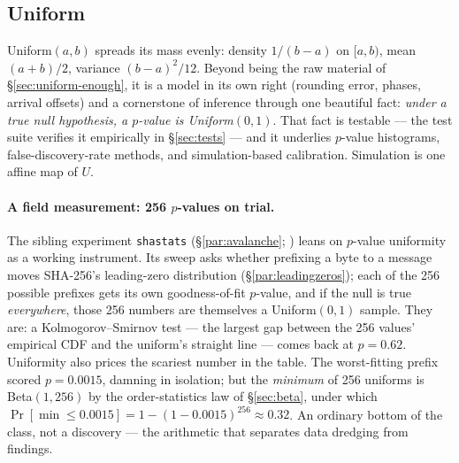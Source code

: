 \documentclass[11pt]{article}
\numberwithin{equation}{section}
\begin{document}
\subsection{Uniform}\label{sec:uniform}

Uniform$(a,b)$ spreads its mass evenly: density $1/(b-a)$ on $[a,b)$, mean
$(a+b)/2$, variance $(b-a)^2/12$.  Beyond being the raw material of
\S\ref{sec:uniform-enough}, it is a model in its own right (rounding
error, phases, arrival offsets) and a cornerstone of inference through one
beautiful fact: \emph{under a true null hypothesis, a $p$-value is
Uniform$(0,1)$}.  That fact is testable --- the test suite verifies it
empirically in \S\ref{sec:tests} --- and it underlies $p$-value histograms,
false-discovery-rate methods, and simulation-based calibration.
Simulation is one affine map of $U$.

\paragraph{A field measurement: 256 $p$-values on trial.}
\label{par:pvalunif}
The sibling experiment \texttt{shastats} (\S\ref{par:avalanche};
\citealp{shastats2026}) leans on $p$-value uniformity as a working
instrument.  Its sweep asks whether prefixing a byte to a message moves
SHA-256's leading-zero distribution (\S\ref{par:leadingzeros}); each of
the 256 possible prefixes gets its own goodness-of-fit $p$-value, and if
the null is true \emph{everywhere}, those 256 numbers are themselves a
Uniform$(0,1)$ sample.  They are: a Kolmogorov--Smirnov test --- the
largest gap between the 256 values' empirical CDF and the uniform's
straight line --- comes back at $p=0.62$.  Uniformity also prices the
scariest number in the table.  The worst-fitting prefix scored
$p=0.0015$, damning in isolation; but the \emph{minimum} of 256 uniforms
is Beta$(1,256)$ by the order-statistics law of \S\ref{sec:beta}, under
which $\Pr[\min\le 0.0015]=1-(1-0.0015)^{256}\approx 0.32$.  An ordinary
bottom of the class, not a discovery --- the arithmetic that separates
data dredging from findings.
\end{document}
